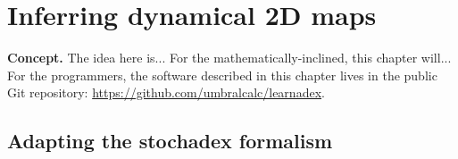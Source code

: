 \chapter{\sffamily Inferring dynamical 2D maps}

{\bfseries\sffamily Concept.} The idea here is... For the mathematically-inclined, this chapter will... For the programmers, the software described in this chapter lives in the public Git repository: \href{https://github.com/umbralcalc/learnadex}{https://github.com/umbralcalc/learnadex}.


\section{\sffamily Adapting the stochadex formalism}
